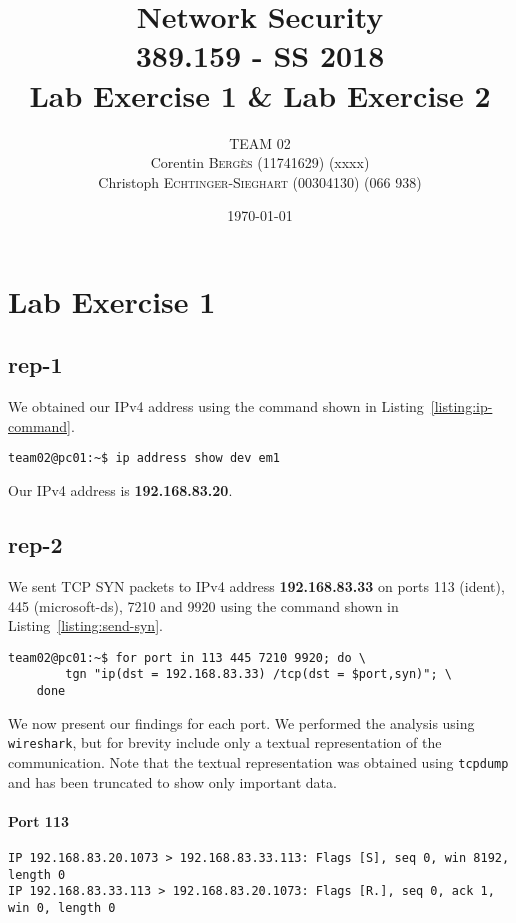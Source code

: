 \documentclass{article}
\title{Network Security \\ 389.159 - SS 2018 \\ Lab Exercise 1 \& Lab Exercise 2} %
\author{
    TEAM 02 \\
    Corentin \textsc{Bergès} (11741629) (xxxx) \\
    Christoph \textsc{Echtinger-Sieghart} (00304130) (066 938)
}
\date{\today} %
\begin{document}
\maketitle %

\renewcommand{\arraystretch}{2} %
\section{Lab Exercise 1}

\subsection{rep-1}

We obtained our IPv4 address using the command shown in Listing~\ref{listing:ip-command}.

\begin{lstlisting}[label=listing:ip-command,caption={Command used to obtain IP address}]
team02@pc01:~$ ip address show dev em1
\end{lstlisting}

Our IPv4 address is \textbf{192.168.83.20}.

\subsection{rep-2}

We sent TCP SYN packets to IPv4 address \textbf{192.168.83.33} on ports 113 (ident), 445 (microsoft-ds),
7210 and 9920 using the command shown in Listing~\ref{listing:send-syn}.

\begin{lstlisting}[label=listing:send-syn,caption={Command used to send the SYN packets}]
team02@pc01:~$ for port in 113 445 7210 9920; do \
        tgn "ip(dst = 192.168.83.33) /tcp(dst = $port,syn)"; \
    done
\end{lstlisting}

We now present our findings for each port. We performed the analysis using \texttt{wireshark}, but for
brevity include only a textual representation of the communication. Note that the textual representation was
obtained using \texttt{tcpdump} and has been truncated to show only important data.

\paragraph{Port 113}
\begin{Verbatim}
IP 192.168.83.20.1073 > 192.168.83.33.113: Flags [S], seq 0, win 8192, length 0
IP 192.168.83.33.113 > 192.168.83.20.1073: Flags [R.], seq 0, ack 1, win 0, length 0
\end{Verbatim}
\end{document}
